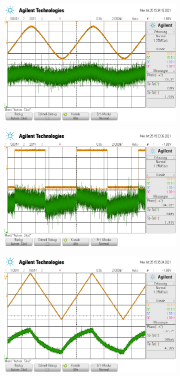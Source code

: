 \begin{figure}
  \centering
  \begin{subfigure}{0.4\textwidth}
    \centering
    \includegraphics[width=\textwidth]{ressources/differential_sinus.png}
  \end{subfigure}
  \begin{subfigure}{0.4\textwidth}
    \centering
    \includegraphics[width=\textwidth]{ressources/differential_rechteck.png}
  \end{subfigure}
  \begin{subfigure}{0.4\textwidth}
    \centering
    \includegraphics[width=\textwidth]{ressources/differential_dreieck.png}

\end{subfigure}
\end{figure}
